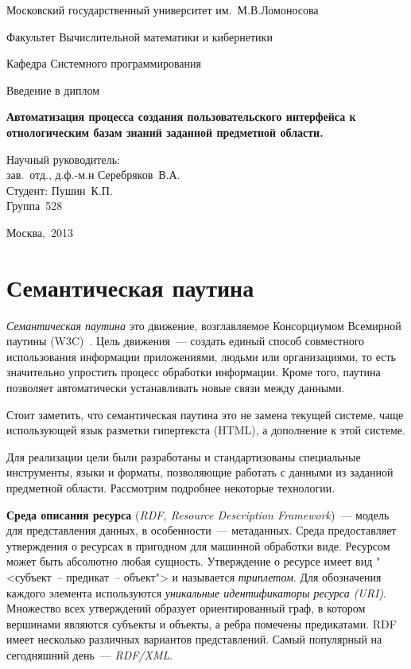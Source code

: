 \documentclass[oneside, a4paper, final, 14 pt]{extarticle}
\begin{document}
\begin{titlepage}
  \centerline{Московский государственный университет им.~М.В.Ломоносова}
  \centerline{Факультет Вычислительной математики и кибернетики}
  \smallskip
  \small
  \centerline{Кафедра Системного программирования}
  \centerline{\hfill\hrulefill\hrulefill\hfill}
  \vfill
  \vfill
  \vfill
  \Large
  \centerline{Введение в диплом}
  \Large
  \begin{centering}
  {\bf Автоматизация процесса создания пользовательского интерфейса к отнологическим базам знаний заданной предметной области.\\}
  \end{centering}
  \normalsize
  \vfill
  \vfill
  \vfill
  \vfill
  \begin{flushright}
  Научный руководитель:\\ зав.~отд., д.ф.-м.н Серебряков~В.А.\\
  \vfill
  Студент: Пушин~К.П.\\
  Группа~528\\
  \end{flushright}
  \vfill
  \vfill
  \vfill
  \centerline{Москва,~2013}
\end{titlepage}

\setcounter{page}{2}

\setcounter{tocdepth}{2}
\tableofcontents
\newpage

\section{Семантическая паутина}

\emph{Семантическая паутина} это движение, возглавляемое Консорциумом 
Всемирной паутины (W3C)~\cite{article:semweb}. Цель движения~--- создать единый способ совместного 
использования информации приложениями, людьми или организациями, то есть значительно упростить 
процесс обработки информации. Кроме того, паутина позволяет автоматически устанавливать новые связи 
между данными.

Стоит заметить, что семантическая паутина это не замена текущей системе, чаще использующей язык 
разметки гипертекста (HTML), а дополнение к этой системе.

Для реализации цели были разработаны и стандартизованы специальные инструменты, языки и форматы, 
позволяющие работать с данными из заданной предметной области. Рассмотрим подробнее некоторые 
технологии.

\textbf{Среда описания ресурса} \cite{rdf} (\emph{RDF, Resource Description Framework})~--- модель для 
представления данных, в особенности~--- метаданных. Среда предоставляет утверждения о ресурсах в 
пригодном для машинной обработки виде. Ресурсом может быть абсолютно любая сущность. Утверждение о 
ресурсе имеет вид "<субъект~-- предикат~-- объект"> и называется \emph{триплетом}. Для обозначения 
каждого элемента используются \emph{уникальные идентификаторы ресурса (URI)}. Множество всех 
утверждений образует ориентированный граф, в котором вершинами являются субъекты и объекты, а ребра 
помечены предикатами. RDF имеет несколько различных вариантов представлений. Самый популярный на 
сегодняшний день~--- \emph{RDF/XML}.
\end{document}
